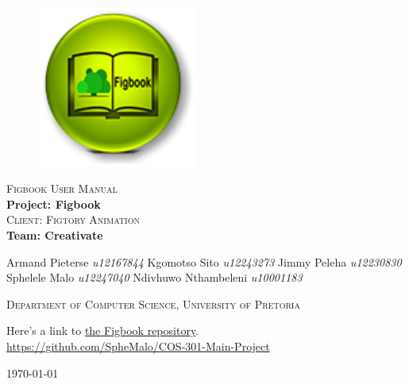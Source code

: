 \begin{titlepage}
	\begin{center}
		
		\begin{figure}[t]
			\centering
			\includegraphics[width=200px]{images/figbooklogo-u216.png}
		\end{figure}
		
		\textsc{\Huge Figbook User Manual} \\ 
		\vspace{2cm}
		\textbf{\Large Project: Figbook} \\ 
		\textsc{\small Client: Figtory Animation} \\ 
		\vspace{2cm}
		\textbf{\large Team: Creativate } \\ 
		\begin{flushright} \large
			Armand Pieterse \emph{u12167844} \newline
			Kgomotso Sito 		\emph{u12243273} \newline
			Jimmy Peleha		\emph{u12230830} \newline
			Sphelele Malo 	\emph{u12247040} \newline
			Ndivhuwo Nthambeleni 	\emph{u10001183} \newline
			\end{flushright}
		\textsc{\small Department of Computer Science, University of Pretoria}
		
		\vfill
		
	Here's a link to \href{https://github.com/SpheMalo/COS-301-Main-Project}{the Figbook repository}.\\
	\url{https://github.com/SpheMalo/COS-301-Main-Project}

	\vfill

	{\large \today}	
	
		
		
	\end{center}
\end{titlepage}
